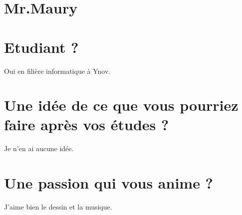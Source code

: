 \documentclass{article}
\author{Louis MAURY}
\begin{document}
\section{Mr.Maury}
\section{Etudiant ?}
Oui en filière informatique à Ynov.
\section{Une idée de ce que vous pourriez faire après vos études ?}
Je n'en ai aucune idée.
\section{Une passion qui vous anime ?}
J'aime bien le dessin et la musique.
\end{document}
